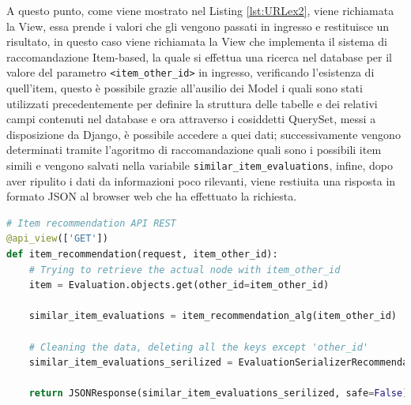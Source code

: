 A questo punto, come viene mostrato nel Listing \ref{lst:URLex2}, viene richiamata la View, essa prende i valori che gli vengono passati in ingresso e 
restituisce un risultato, in questo caso viene richiamata la View che implementa il sistema di raccomandazione Item-based, la quale si effettua una ricerca 
nel database per il valore del parametro \texttt{<item\_other\_id>} in ingresso, verificando l'esistenza di quell'item, questo è possibile
grazie all'ausilio dei Model i quali sono stati utilizzati precedentemente per definire la struttura delle tabelle e dei relativi campi 
contenuti nel database e ora attraverso i cosiddetti QuerySet, messi a disposizione da Django, è possibile accedere a quei dati; successivamente vengono 
determinati tramite l'agoritmo di raccomandazione quali sono i possibili item simili e vengono salvati nella variabile \texttt{similar\_item\_evaluations}, 
infine, dopo aver ripulito i dati da informazioni poco rilevanti, viene restiuita una risposta in formato JSON al browser web che ha effettuato la richiesta.
\lstset{style=python_code_style}
\begin{lstlisting}[language=Python, label=lst:URLex2]
# Item recommendation API REST
@api_view(['GET'])
def item_recommendation(request, item_other_id):
    # Trying to retrieve the actual node with item_other_id
    item = Evaluation.objects.get(other_id=item_other_id)

    similar_item_evaluations = item_recommendation_alg(item_other_id)

    # Cleaning the data, deleting all the keys except 'other_id'
    similar_item_evaluations_serilized = EvaluationSerializerRecommendation(similar_item_evaluations, many=True).data

    return JSONResponse(similar_item_evaluations_serilized, safe=False)
\end{lstlisting}
%
